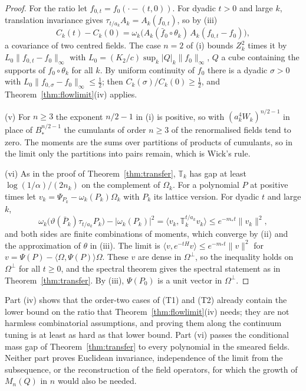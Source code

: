 \documentclass[aps,prd,twocolumn,superscriptaddress,nofootinbib,longbibliography,floatfix,amsmath,amssymb,10pt]{revtex4-2}
\theoremstyle{definition}
\theoremstyle{remark}
\newcommand{\ip}[2]{\langle #1,#2\rangle}
\begin{document}
\begin{proof}
For the ratio let $f_{0,t}=f_0(\cdot-(t,0))$. For dyadic $t>0$ and large
$k$, translation invariance gives $\tau_{t/a_k}A_k=A_k(f_{0,t})$, so by
(iii)
\[
C_k(t)-C_k(0)=\omega_k\bigl(A_k(\bar f_0\circ\theta_k)\,
A_k(f_{0,t}-f_0)\bigr),
\]
a covariance of two centred fields. The case $n=2$ of (i) bounds $Z_k^2$
times it by $L_0\|f_{0,t}-f_0\|_\infty$ with
$L_0=(K_2/c)\sup_k|Q|_k\|f_0\|_\infty$, $Q$ a cube containing the supports
of $f_0\circ\theta_k$ for all $k$. By uniform continuity of $f_0$ there is a
dyadic $\sigma>0$ with $L_0\|f_{0,\sigma}-f_0\|_\infty\le\frac12$; then
$C_k(\sigma)/C_k(0)\ge\frac12$, and Theorem~\ref{thm:flowlimit}(iv) applies.

(v) For $n\ge3$ the exponent $n/2-1$ in (i) is positive, so with
$(a_k^4W_k)^{n/2-1}$ in place of $B_*^{n/2-1}$ the cumulants of order $n\ge3$ of
the renormalised fields tend to zero. The moments are the sums over partitions
of products of cumulants, so in the limit only the partitions into pairs
remain, which is Wick's rule.

(vi) As in the proof of Theorem~\ref{thm:transfer}, $\mathbb T_k$ has gap at
least $\log(1/\alpha)/(2n_k)$ on the complement of $\Omega_k$. For a
polynomial $P$ at positive times let $v_k=\Psi_{P_k}-\omega_k(P_k)\Omega_k$
with $P_k$ its lattice version. For dyadic $t$ and large $k$,
\[
\omega_k\bigl(\vartheta(\bar P_k)\tau_{t/a_k}P_k\bigr)-|\omega_k(P_k)|^2
=\ip{v_k}{\mathbb T_k^{t/a_k}v_k}\le e^{-m_*t}\|v_k\|^2 ,
\]
and both sides are finite combinations of moments, which converge by (ii)
and the approximation of $\theta$ in (iii). The limit is
$\ip v{e^{-tH}v}\le e^{-m_*t}\|v\|^2$ for $v=\Psi(P)-\ip\Omega{\Psi(P)}\Omega$.
These $v$ are dense in $\Omega^\perp$, so the inequality holds on
$\Omega^\perp$ for all $t\ge0$, and the spectral theorem gives the spectral
statement as in Theorem~\ref{thm:transfer}. By (iii), $\Psi(P_0)$ is a unit
vector in $\Omega^\perp$.
\end{proof}

Part (iv) shows that the order-two cases of (T1) and (T2) already contain
the lower bound on the ratio that Theorem~\ref{thm:flowlimit}(iv) needs; they
are not harmless combinatorial assumptions, and proving them along the
continuum tuning is at least as hard as that lower bound. Part (vi) passes the
conditional mass gap of Theorem~\ref{thm:transfer} to every polynomial in the
smeared fields. Neither part proves Euclidean invariance, independence of the
limit from the subsequence, or the reconstruction of the field operators,
for which the growth of $M_n(Q)$ in $n$ would also be needed.
\end{document}
